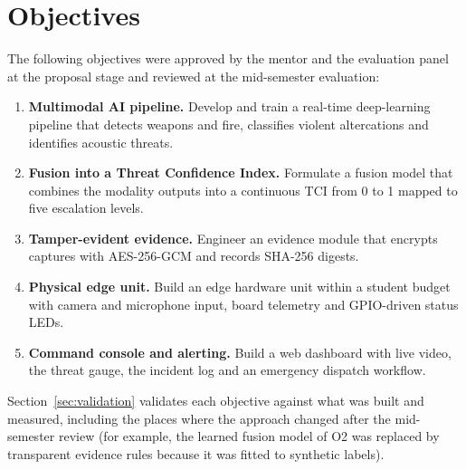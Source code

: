 \section{Objectives}
\label{sec:objectives}
The following objectives were approved by the mentor and the evaluation panel at the proposal stage and reviewed at the mid-semester evaluation:
\begin{enumerate}[label=\textbf{O\arabic*.}]
\item \textbf{Multimodal AI pipeline.} Develop and train a real-time deep-learning pipeline that detects weapons and fire, classifies violent altercations and identifies acoustic threats.
\item \textbf{Fusion into a Threat Confidence Index.} Formulate a fusion model that combines the modality outputs into a continuous TCI from 0 to 1 mapped to five escalation levels.
\item \textbf{Tamper-evident evidence.} Engineer an evidence module that encrypts captures with AES-256-GCM and records SHA-256 digests.
\item \textbf{Physical edge unit.} Build an edge hardware unit within a student budget with camera and microphone input, board telemetry and GPIO-driven status LEDs.
\item \textbf{Command console and alerting.} Build a web dashboard with live video, the threat gauge, the incident log and an emergency dispatch workflow.
\end{enumerate}
Section~\ref{sec:validation} validates each objective against what was built and measured, including the places where the approach changed after the mid-semester review (for example, the learned fusion model of O2 was replaced by transparent evidence rules because it was fitted to synthetic labels).

